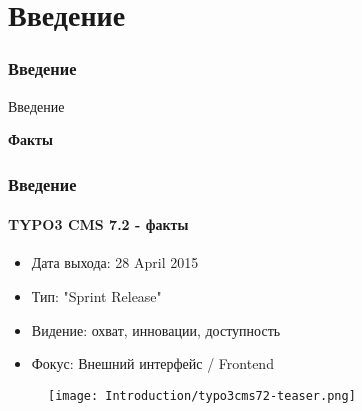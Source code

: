 %

\section{Введение}
\begin{frame}[fragile]
	\frametitle{Введение}

	\begin{center}\huge{Введение}\end{center}
	\begin{center}\huge{\color{typo3darkgrey}\textbf{Факты}}\end{center}

\end{frame}

\begin{frame}[fragile]
	\frametitle{Введение}
	\framesubtitle{TYPO3 CMS 7.2 - факты}

	\begin{itemize}
		\item Дата выхода: 28 April 2015
		\item Тип: "Sprint Release"
		\item Видение: охват, инновации, доступность
		\item Фокус: Внешний интерфейс / Frontend
	\end{itemize}

	\begin{figure}
		\texttt{[image: Introduction/typo3cms72-teaser.png]}
	\end{figure}

\end{frame}

